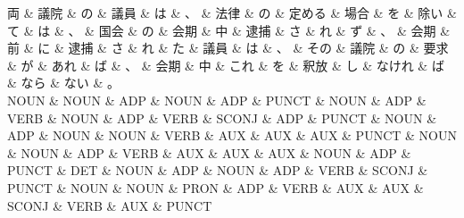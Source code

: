 \documentclass[tikz,border=5pt]{standalone}
\begin{document}
\small
\begin{dependency}[edge unit distance=9.3pt]
    \begin{deptext}[column sep=0.5em]
        両 \& 議院 \& の \& 議員 \& は \& 、 \& 法律 \& の \& 定める \& 場合 \& を \& 除い \& て \& は \& 、 \& 国会 \& の \& 会期 \& 中 \& 逮捕 \& さ \& れ \& ず \& 、 \& 会期 \& 前 \& に \& 逮捕 \& さ \& れ \& た \& 議員 \& は \& 、 \& その \& 議院 \& の \& 要求 \& が \& あれ \& ば \& 、 \& 会期 \& 中 \& これ \& を \& 釈放 \& し \& なけれ \& ば \& なら \& ない \& 。\\
        NOUN \& NOUN \& ADP \& NOUN \& ADP \& PUNCT \& NOUN \& ADP \& VERB \& NOUN \& ADP \& VERB \& SCONJ \& ADP \& PUNCT \& NOUN \& ADP \& NOUN \& NOUN \& VERB \& AUX \& AUX \& AUX \& PUNCT \& NOUN \& NOUN \& ADP \& VERB \& AUX \& AUX \& AUX \& NOUN \& ADP \& PUNCT \& DET \& NOUN \& ADP \& NOUN \& ADP \& VERB \& SCONJ \& PUNCT \& NOUN \& NOUN \& PRON \& ADP \& VERB \& AUX \& AUX \& SCONJ \& VERB \& AUX \& PUNCT\\
    \end{deptext}
\end{dependency}
\end{document}
